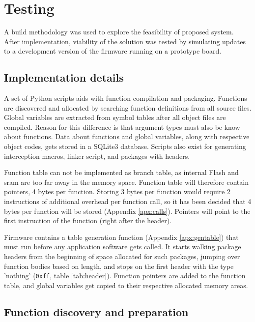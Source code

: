 \newpage
\section{Testing}

A build methodology was used to explore the feasibility of proposed system. After implementation, viability of the solution was tested by simulating updates to a development version of the firmware running on a prototype board.

\subsection{Implementation details}

A set of Python scripts aids with function compilation and packaging. Functions are discovered and allocated by searching function definitions from all source files. Global variables are extracted from symbol tables after all object files are compiled. Reason for this difference is that argument types must also be know about functions. Data about functions and global variables, along with respective object codes, gets stored in a SQLite3 database. Scripts also exist for generating interception macros, linker script, and packages with headers.

Function table can not be implemented as branch table, as internal Flash and \gls{sram} are too far away in the memory space. Function table will therefore contain pointers, 4 bytes per function. Storing 3 bytes per function would require 2 instructions of additional overhead per function call, so it has been decided that 4 bytes per function will be stored (Appendix \ref{apx:calls}). Pointers will point to the first instruction of the function (right after the header).

Firmware contains a table generation function (Appendix \ref{apx:gentable}) that must run before any application software gets called. It starts walking package headers from the beginning of space allocated for such packages, jumping over function bodies based on length, and stops on the first header with the type 'nothing' (\texttt{0xff}, table \ref{tab:header}). Function pointers are added to the function table, and global variables get copied to their respective allocated memory areas.

\subsection{Function discovery and preparation}

